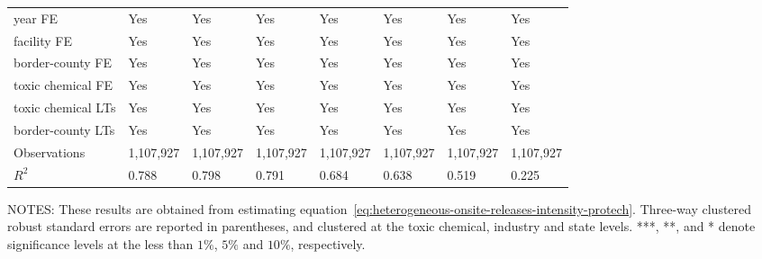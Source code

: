 \begin{table}[H]
{\begin{tabular}{@{}llllllll@{}}
            year FE                         & Yes       & Yes           & Yes       & Yes          & Yes             & Yes           & Yes                 \\
            facility FE                     & Yes       & Yes           & Yes       & Yes          & Yes             & Yes           & Yes                 \\
            border-county FE                & Yes       & Yes           & Yes       & Yes          & Yes             & Yes           & Yes                 \\
            toxic chemical FE               & Yes       & Yes           & Yes       & Yes          & Yes             & Yes           & Yes                 \\
            toxic chemical LTs              & Yes       & Yes           & Yes       & Yes          & Yes             & Yes           & Yes                 \\
            border-county LTs               & Yes       & Yes           & Yes       & Yes          & Yes             & Yes           & Yes                 \\ \midrule
            Observations                    & 1,107,927 & 1,107,927     & 1,107,927 & 1,107,927    & 1,107,927       & 1,107,927     & 1,107,927           \\
            $R^2$                           & 0.788     & 0.798         & 0.791     & 0.684        & 0.638           & 0.519         & 0.225               \\\bottomrule \bottomrule
        \end{tabular}%
    }
    \begin{minipage}{\columnwidth}
        \vspace{0.05in}
        \tiny NOTES: These results are obtained from estimating equation~\ref{eq:heterogeneous-onsite-releases-intensity-protech}. Three-way clustered robust standard errors are reported in parentheses, and clustered at the toxic chemical, industry and state levels. ***, **, and * denote significance levels at the less than $1\%$, $5\%$ and $10\%$, respectively.
    \end{minipage}
\end{table}